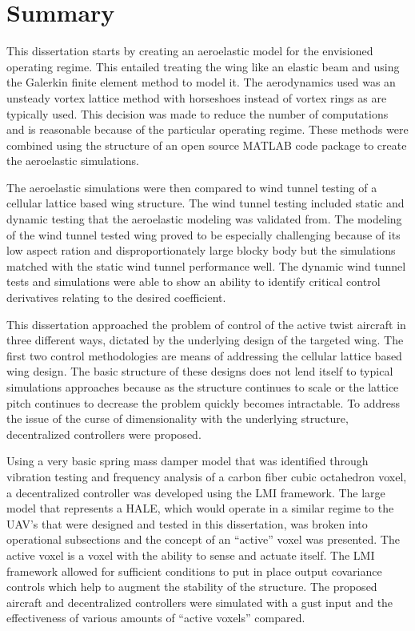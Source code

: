 \documentclass[11pt]{ucthesis}
\begin{document}
\section{Summary}

This dissertation starts by creating an aeroelastic model for the envisioned operating regime. This entailed treating the wing like an elastic beam and using the Galerkin finite element method to model it. The aerodynamics used was an unsteady vortex lattice method with horseshoes instead of vortex rings as are typically used. This decision was made to reduce the number of computations and is reasonable because of the particular operating regime. These methods were combined using the structure of an open source MATLAB code package to create the aeroelastic simulations.

The aeroelastic simulations were then compared to wind tunnel testing of a cellular lattice based wing structure. The wind tunnel testing included static and dynamic testing that the aeroelastic modeling was validated from. The modeling of the wind tunnel tested wing proved to be especially challenging because of its low aspect ration and disproportionately large blocky body but the simulations matched with the static wind tunnel performance well. The dynamic wind tunnel tests and simulations were able to show an ability to identify critical control derivatives relating to the desired coefficient.

This dissertation approached the problem of control of the active twist aircraft in three different ways, dictated by the underlying design of the targeted wing. The first two control methodologies are means of addressing the cellular lattice based wing design. The basic structure of these designs does not lend itself to typical simulations approaches because as the structure continues to scale or the lattice pitch continues to decrease the problem quickly becomes intractable. To address the issue of the curse of dimensionality with the underlying structure, decentralized controllers were proposed.

Using a very basic spring mass damper model that was identified through vibration testing and frequency analysis of a carbon fiber cubic octahedron voxel, a decentralized controller was developed using the LMI framework. The large model that represents a HALE, which would operate in a similar regime to the UAV's that were designed and tested in this dissertation, was broken into operational subsections and the concept of an ``active'' voxel was presented. The active voxel is a voxel with the ability to sense and actuate itself. The LMI framework allowed for sufficient conditions to put in place output covariance controls which help to augment the stability of the structure. The proposed aircraft and decentralized controllers were simulated with a gust input and the effectiveness of various amounts of ``active voxels'' compared.
\end{document}
